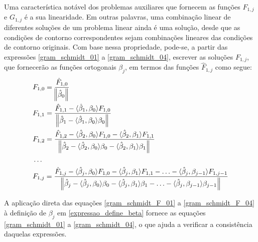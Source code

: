 Uma característica notável dos problemas auxiliares que fornecem as funções $F_{1,j}$ e $G_{1,j}$ é a sua linearidade. Em outras palavras, uma combinação linear de diferentes soluções de um problema linear ainda é uma solução, desde que as condições de contorno correspondentes sejam combinações lineares das condições de contorno originais. Com base nessa propriedade, pode-se, a partir das expressões \eqref{gram_schmidt_01} a \eqref{gram_schmidt_04}, escrever as soluções $F_{1,j}$, que fornecerão as funções ortogonais $\beta_j$, em termos das funções $\hat{F}_{1,j}$ como segue:
\begin{align}
& F_{1,0} = \frac{\hat{F}_{1,0}}{\norm{\hat{\beta}_0}} \label{gram_schmidt_F_01} \\
& F_{1,1}
=
\frac{\hat{F}_{1,1} - \langle \hat{\beta}_1, \beta_0\rangle F_{1,0}}
{\norm{\hat{\beta}_1 - \langle \hat{\beta}_1, \beta_0\rangle\beta_0}}\label{gram_schmidt_F_02} \\
& F_{1,2}
=
\frac{\hat{F}_{1,2} - \langle \hat{\beta}_2, \beta_0\rangle F_{1,0} - \langle \hat{\beta}_2, \beta_1\rangle F_{1,1}}
{\norm{\hat{\beta}_2 - \langle \hat{\beta}_2, \beta_0\rangle\beta_0 - \langle \hat{\beta}_2, \beta_1\rangle\beta_1}} \label{gram_schmidt_F_03} \\
& \ldots \nonumber \\
& F_{1,j}
=
\frac{\hat{F}_{1,j} - \langle \hat{\beta}_j, \beta_0\rangle F_{1,0} - \langle \hat{\beta}_j, \beta_1\rangle F_{1,1} - \ldots - \langle \hat{\beta}_j, \beta_{j - 1}\rangle F_{1,j - 1} }
{\norm{\hat{\beta}_j - \langle \hat{\beta}_j, \beta_0\rangle\beta_0 - \langle \hat{\beta}_j, \beta_1\rangle\beta_1 - \ldots - \langle \hat{\beta}_j, \beta_{j - 1}\rangle\beta_{j - 1} }} \label{gram_schmidt_F_04}
\end{align}

A aplicação direta das equações \eqref{gram_schmidt_F_01} a \eqref{gram_schmidt_F_04} à definição de $\beta_j$ em \eqref{expressao_define_beta} fornece as equações \eqref{gram_schmidt_01} a \eqref{gram_schmidt_04}, o que ajuda a verificar a consistência daquelas expressões.

